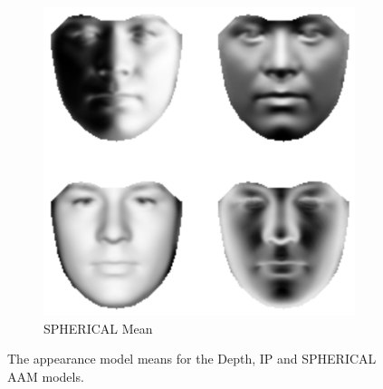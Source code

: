 \begin{figure}[t]
\begin{subfigure}[b]{0.3\textwidth}
    	\includegraphics[width=\textwidth]{statistical_normals/images/lk2d/spherical_aam_mean.png}
    	\caption{SPHERICAL Mean}\label{subfig:singl_img_spherical_aam_mean}
    \end{subfigure}
    \hspace*{\fill}
    \caption{The appearance model means for the Depth, IP and SPHERICAL 
             AAM models.}
\label{fig:single_img_2d_aam_means}
\end{figure}
